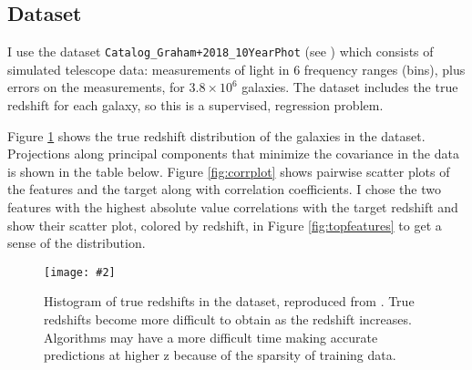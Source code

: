 \documentclass[13pt]{amsart}
\newcommand{\figscale}[4]{
\begin{figure}[ht]
    \centering
    \caption{#3}
    \label{#4}
    \texttt{[image: \#2]}
\end{figure}
}
\begin{document}
  \subsection{Dataset}

    I use the dataset \texttt{Catalog\_Graham+2018\_10YearPhot} (see \cite{graham}) which consists of simulated telescope data: measurements of light in 6 frequency ranges (bins), plus errors on the measurements, for $3.8 \times 10^6$ galaxies. The dataset includes the true redshift for each galaxy, so this is a supervised, regression problem.

    Figure \ref{fig:zdist} shows the true redshift distribution of the galaxies in the dataset. Projections along principal components that minimize the covariance in the data is shown in the table below. Figure \ref{fig:corrplot} shows pairwise scatter plots of the features and the target along with correlation coefficients. I chose the two features with the highest absolute value correlations with the target redshift and show their scatter plot, colored by redshift, in Figure \ref{fig:topfeatures} to get a sense of the distribution.

    \figscale{0.6}{../plots/figure_true_redshift_histogram.png}{Histogram of true redshifts in the dataset, reproduced from \cite{graham}. True redshifts become more difficult to obtain as the redshift increases. Algorithms may have a more difficult time making accurate predictions at higher z because of the sparsity of training data.}{fig:zdist}
\end{document}

